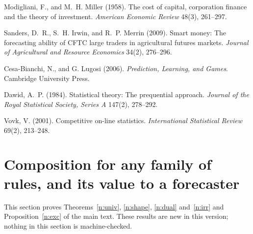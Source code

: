  Modigliani, F., and M.~H. Miller (1958). The cost of capital, corporation finance and the theory of investment. \emph{American Economic Review} 48(3), 261--297.

 Sanders, D.~R., S.~H. Irwin, and R.~P. Merrin (2009). Smart money: The forecasting ability of CFTC large traders in agricultural futures markets. \emph{Journal of Agricultural and Resource Economics} 34(2), 276--296.

 Cesa-Bianchi, N., and G. Lugosi (2006). \emph{Prediction, Learning, and Games}. Cambridge University Press.

 Dawid, A.~P. (1984). Statistical theory: The prequential approach. \emph{Journal of the Royal Statistical Society, Series A} 147(2), 278--292.

 Vovk, V. (2001). Competitive on-line statistics. \emph{International Statistical Review} 69(2), 213--248.

\section{Composition for any family of rules, and its value to a forecaster}\label{app:univirr}

This section proves Theorems~\ref{n:univ}, \ref{n:shape}, \ref{n:dual} and~\ref{n:irr} and Proposition~\ref{n:exc} of the main text. These results are new in this version; nothing in this section is machine-checked.

